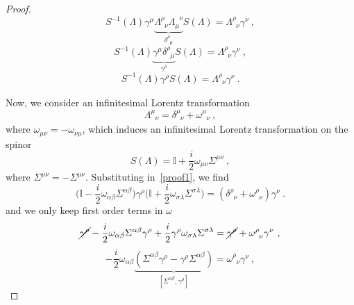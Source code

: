 \begin{proof}
\begin{equation*}
            S^{-1}(\Lambda) \gamma^\mu \underbrace{\Lambda^\rho_{\phantom \rho \nu} \Lambda_\mu^{\phantom \mu \nu}}_{\delta^\rho_{\phantom \rho \mu} } S(\Lambda) = \Lambda^\rho_{\phantom \rho \nu} \gamma^\nu ~,
        \end{equation*}
        \begin{equation*}
            S^{-1}(\Lambda) \underbrace{\gamma^\mu \delta^\rho_{\phantom \rho \mu}}_{\gamma^\rho}  S(\Lambda) = \Lambda^\rho_{\phantom \rho \nu} \gamma^\nu ~,
        \end{equation*}
        \begin{equation}\label{proof1}
            S^{-1}(\Lambda) \gamma^\rho  S(\Lambda) = \Lambda^\rho_{\phantom \rho \nu} \gamma^\nu ~.
        \end{equation}

        Now, we consider an infinitesimal Lorentz transformation 
        \begin{equation*}
            \Lambda^\mu_{\phantom \mu \nu} = \delta^\mu_{\phantom \mu \nu} + \omega^\mu_{\phantom \mu \nu} ~,
        \end{equation*}
        where $\omega_{\mu\nu} = - \omega_{\nu\mu}$, which induces an infinitesimal Lorentz transformation on the spinor 
        \begin{equation*}
            S(\Lambda) = \mathbb I + \frac{i}{2} \omega_{\mu\nu} \Sigma^{\mu\nu} ~,
        \end{equation*}
        where $\Sigma^{\mu\nu} = - \Sigma^{\mu\nu}$. Substituting in~\eqref{proof1}, we find 
        \begin{equation*}
            \Big (\mathbb I - \frac{i}{2} \omega_{\alpha\beta} \Sigma^{\alpha\beta} \Big) \gamma^\rho \Big (\mathbb I + \frac{i}{2} \omega_{\sigma\lambda} \Sigma^{\sigma\lambda} \Big) = (\delta^\rho_{\phantom \rho \nu} + \omega^\rho_{\phantom \rho \nu}) \gamma^\nu ~.
        \end{equation*}
        and we only keep first order terms in $\omega$ 
        \begin{equation*}
            \cancel{\gamma^\rho} - \frac{i}{2} \omega_{\alpha\beta} \Sigma^{\alpha\beta} \gamma^\rho + \frac{i}{2} \gamma^\rho \omega_{\sigma\lambda} \Sigma^{\sigma\lambda} = \cancel{\gamma^\rho} + \omega^\rho_{\phantom \rho \nu} \gamma^\nu ~,
        \end{equation*}
        \begin{equation*}
            - \frac{i}{2} \omega_{\alpha\beta} \underbrace{(\Sigma^{\alpha\beta} \gamma^\rho - \gamma^\rho \Sigma^{\alpha\beta})}_{[\Sigma^{\alpha\beta}, \gamma^\rho]} = \omega^\rho_{\phantom \rho \nu} \gamma^\nu ~,

\end{equation*}
\end{proof}
